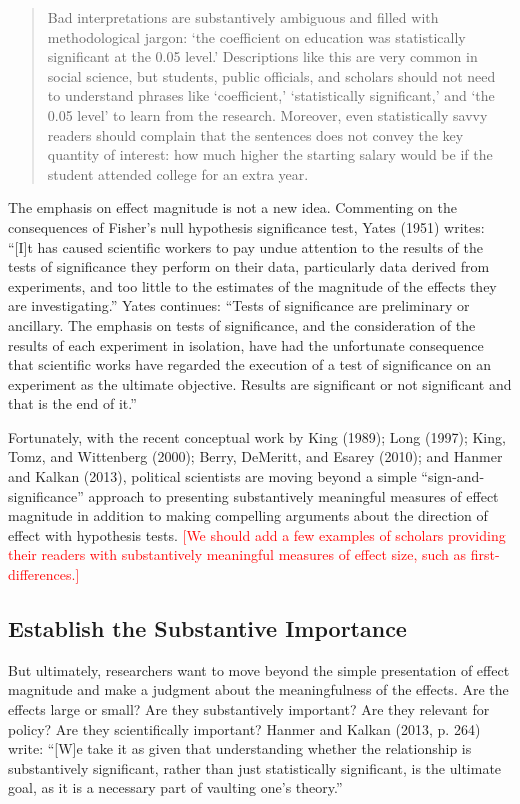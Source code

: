 \documentclass[12pt]{article}
\newcommand{\comment}[1]{\textcolor{red}{#1}}
\begin{document}
\begin{quote}
Bad interpretations are substantively ambiguous and filled with methodological jargon: `the coefficient on education was statistically significant at the 0.05 level.' Descriptions like this are very common in social science, but students, public officials, and scholars should not need to understand phrases like `coefficient,' `statistically significant,' and `the 0.05 level' to learn from the research. Moreover, even statistically savvy readers should complain that the sentences does not convey the key quantity of interest: how much higher the starting salary would be if the student attended college for an extra year.
\end{quote}

The emphasis on effect magnitude is not a new idea. Commenting on the consequences of Fisher's null hypothesis significance test, Yates (1951) writes: ``[I]t has caused scientific workers to pay undue attention to the results of the tests of significance they perform on their data, particularly data derived from experiments, and too little to the estimates of the magnitude of the effects they are investigating.'' Yates continues: ``Tests of significance are preliminary or ancillary. The emphasis on tests of significance, and the consideration of the results of each experiment in isolation, have had the unfortunate consequence that scientific works have regarded the execution of a test of significance on an experiment as the ultimate objective. Results are significant or not significant and that is the end of it.''

Fortunately, with the recent conceptual work by King (1989); Long (1997); King, Tomz, and Wittenberg (2000); Berry, DeMeritt, and Esarey (2010); and Hanmer and Kalkan (2013), political scientists are moving beyond a simple ``sign-and-significance'' approach to presenting substantively meaningful measures of effect magnitude in addition to making compelling arguments about the direction of effect with hypothesis tests. \comment{[We should add a few examples of scholars providing their readers with substantively meaningful measures of effect size, such as first-differences.]}

\subsection*{Establish the Substantive Importance}

But ultimately, researchers want to move beyond the simple presentation of effect magnitude and make a judgment about the meaningfulness of the effects. Are the effects large or small? Are they substantively important? Are they relevant for policy? Are they scientifically important? Hanmer and Kalkan (2013, p. 264) write: ``[W]e take it as given that understanding whether the relationship is substantively significant, rather than just statistically significant, is the ultimate goal, as it is a necessary part of vaulting one's theory.''
\end{document}

